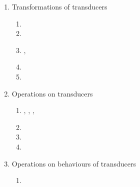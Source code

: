 \begin{enumerate}

\item Transformations of transducers

\begin{enumerate}
\item {}
\item {}
\item {}, 
\item {}
\item {}
\end{enumerate}

\item Operations on transducers

\begin{enumerate}
\item {}, , , 
\item {} %
\item {}
\item {}
\end{enumerate}

\item Operations on behaviours of transducers

\begin{enumerate}
    \item {}
\end{enumerate}

% 
% 
% 

\end{enumerate}

